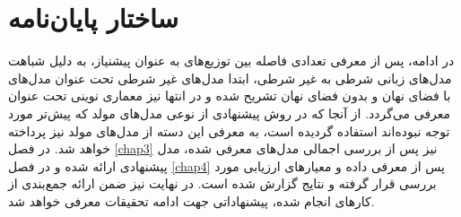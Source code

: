 \section{ساختار پایان‌نامه}
در ادامه، پس از معرفی تعدادی فاصله بین توزیع‌های به عنوان پیشنیاز، به دلیل شباهت مدل‌های زبانی شرطی به غیر شرطی، ابتدا مدل‌های غیر شرطی تحت عنوان مدل‌های با فضای نهان و بدون فضای نهان تشریح شده و در انتها نیز معماری نوینی تحت عنوان \transformer{} معرفی می‌گردد. از آنجا که در روش پیشنهادی از نوعی مدل‌های مولد که پیش‌تر مورد توجه نبوده‌اند استفاده گردیده است، به معرفی این دسته از مدل‌های مولد نیز پرداخته خواهد شد. در فصل \ref{chap3} نیز پس از بررسی اجمالی مدل‌های معرفی شده، مدل پیشنهادی ارائه شده و در فصل  \ref{chap4} پس از معرفی داده و معیارهای ارزیابی مورد بررسی قرار گرفته و نتایج گزارش شده است. در نهایت نیز ضمن ارائه جمع‌بندی از کارهای انجام شده، پیشنهاداتی جهت ادامه تحقیقات معرفی خواهد شد.




